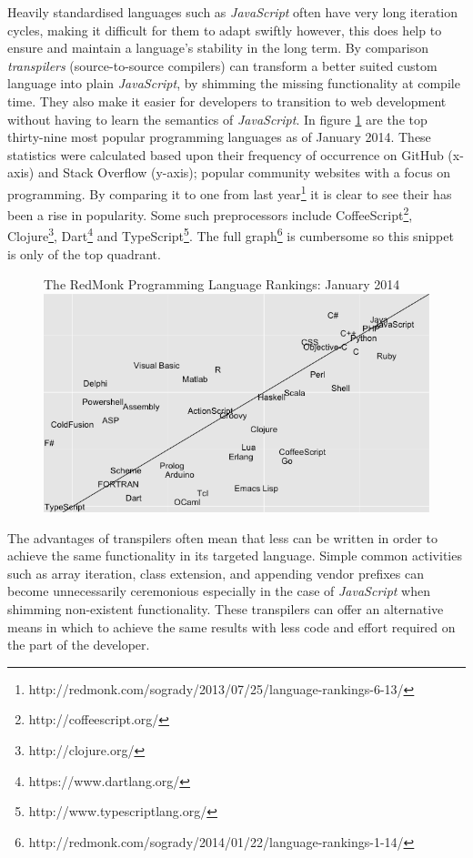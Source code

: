 \documentclass[final]{cmpreport}
\begin{document}
Heavily standardised languages such as \textit{JavaScript} often have very long iteration cycles, making it difficult for them to adapt swiftly however, this does help to ensure and maintain a language's stability in the long term. By comparison \textit{transpilers} (source-to-source compilers) can transform a better suited custom language into plain \textit{JavaScript}, by shimming the missing functionality at compile time. They also make it easier for developers to transition to web development without having to learn the semantics of \textit{JavaScript}. In figure \ref{ranking} are the top thirty-nine most popular programming languages as of January 2014. These statistics were calculated based upon their frequency of occurrence on GitHub (x-axis) and Stack Overflow (y-axis); popular community websites with a focus on programming. By comparing it to one from last year\footnote{http://redmonk.com/sogrady/2013/07/25/language-rankings-6-13/} it is clear to see their has been a rise in popularity. Some such preprocessors include CoffeeScript\footnote{http://coffeescript.org/}, Clojure\footnote{http://clojure.org/}, Dart\footnote{https://www.dartlang.org/} and TypeScript\footnote{http://www.typescriptlang.org/}. The full graph\footnote{http://redmonk.com/sogrady/2014/01/22/language-rankings-1-14/} is cumbersome so this snippet is only of the top quadrant.

\begin{figure}[h]{The RedMonk Programming Language Rankings: January 2014 \label{ranking}}
  \includegraphics[width=1.0\textwidth]{lang-rank-114-wm.png}
\end{figure}

The advantages of transpilers often mean that less can be written in order to achieve the same functionality in its targeted language. Simple common activities such as array iteration, class extension, and appending vendor prefixes can become unnecessarily ceremonious especially in the case of \textit{JavaScript} when shimming non-existent functionality. These transpilers can offer an alternative means in which to achieve the same results with less code and effort required on the part of the developer.
\end{document}
